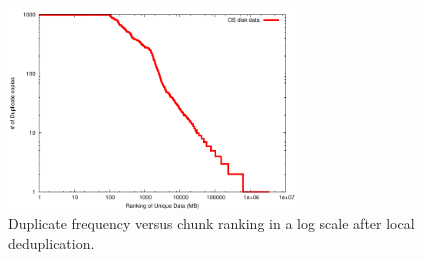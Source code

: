 \begin{figure}
\centering
 \includegraphics[width=3in]{figures/log-log-disk}
\caption{Duplicate frequency versus  chunk ranking in a log scale after local deduplication.}
\label{fig:Datazipf}
\end{figure}



